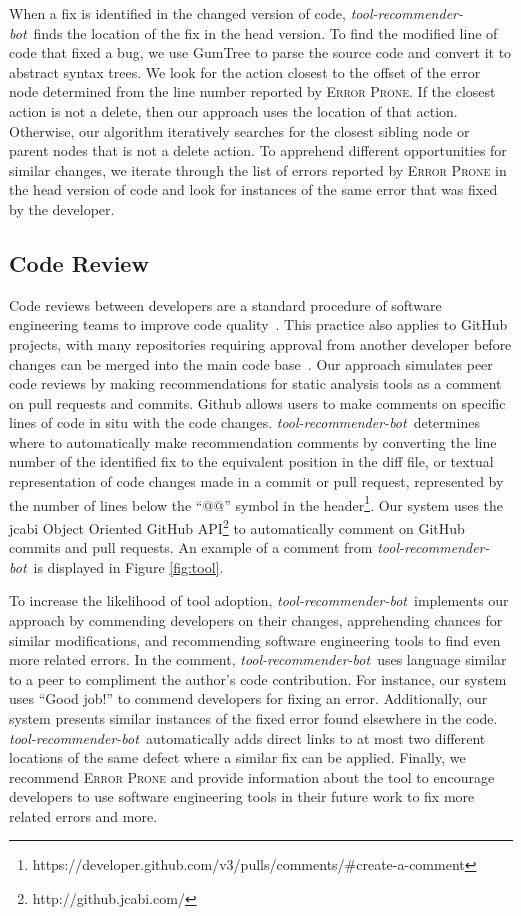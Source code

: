 \documentclass[sigconf,review,anonymous]{acmart}
\newcommand{\tool}{\textsl{tool-recommender-bot}}
\begin{document}
When a fix is identified in the changed version of code, \tool~finds the location of the fix in the head version. To find the modified line of code that fixed a bug, we use GumTree to parse the source code and convert it to abstract syntax trees. We look for the action closest to the offset of the error node determined from the line number reported by \textsc{Error Prone}. If the closest action is not a delete, then our approach uses the location of that action. Otherwise, our algorithm iteratively searches for the closest sibling node or parent nodes that is not a delete action. To apprehend different opportunities for similar changes, we iterate through the list of errors reported by \textsc{Error Prone} in the head version of code and look for instances of the same error that was fixed by the developer.

\subsection{Code Review}

Code reviews between developers are a standard procedure of software engineering teams to improve code quality~\cite{CodeReviewingTrenches}. This practice also applies to GitHub projects, with many repositories requiring approval from another developer before changes can be merged into the main code base~\cite{PullRequestReview}. Our approach simulates peer code reviews by making recommendations for static analysis tools as a comment on pull requests and commits. Github allows users to make comments on specific lines of code in situ with the code changes. \tool~determines where to automatically make recommendation comments by converting the line number of the identified fix to the equivalent position in the diff file, or textual representation of code changes made in a commit or pull request, represented by the number of lines below the ``@@'' symbol in the header\footnote{https://developer.github.com/v3/pulls/comments/\#create-a-comment}. Our system uses the jcabi Object Oriented GitHub API\footnote{http://github.jcabi.com/} to automatically comment on GitHub commits and pull requests. An example of a comment from \tool~is displayed in Figure \ref{fig:tool}.

To increase the likelihood of tool adoption, \tool~implements our approach by commending developers on their changes, apprehending chances for similar modifications, and recommending software engineering tools to find even more related errors. In the comment, \tool~uses language similar to a peer to compliment the author's code contribution. For instance, our system uses ``Good job!'' to commend developers for fixing an error. Additionally, our system presents similar instances of the fixed error found elsewhere in the code.  \tool~automatically adds direct links to at most two different locations of the same defect where a similar fix can be applied. Finally, we recommend \textsc{Error Prone} and provide information about the tool to encourage developers to use software engineering tools in their future work to fix more related errors and more.
\end{document}
